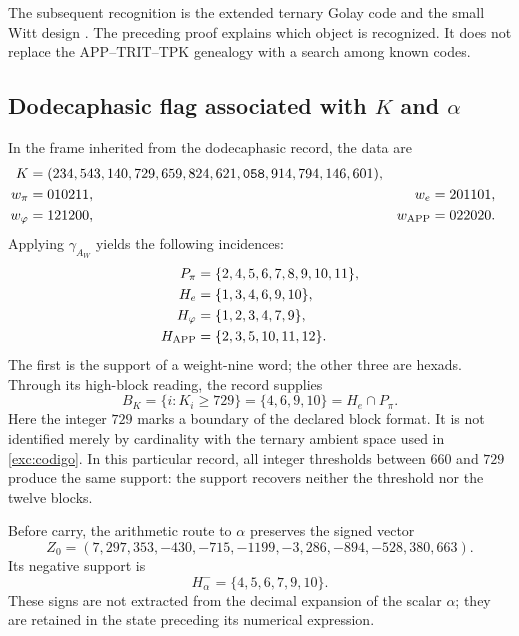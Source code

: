The subsequent recognition is the extended ternary Golay code and
the small Witt design \cite{conwaysloane}. The preceding proof explains which object is
recognized. It does not replace the APP--TRIT--TPK genealogy with a search
among known codes.

\subsection{Dodecaphasic flag associated with \texorpdfstring{$K$ and $\alpha$}{K and alpha}}
\label{exc:bandera}



In the frame inherited from the dodecaphasic record, the data are
\begin{align}
 K={}&(234,543,140,729,659,824,621,\mathtt{058},914,794,146,601),
 \label{exc:k}\\
 w_\pi={}&010211, &w_e={}&201101,\nonumber\\
 w_\varphi={}&121200, &w_{\rm APP}={}&022020.\nonumber
\end{align}
Applying $\gamma_{A_W}$ yields the following incidences:
\begin{align*}
 P_\pi&=\{2,4,5,6,7,8,9,10,11\},\\
 H_e&=\{1,3,4,6,9,10\},\\
 H_\varphi&=\{1,2,3,4,7,9\},\\
 H_{\rm APP}&=\{2,3,5,10,11,12\}.
\end{align*}
The first is the support of a weight-nine word; the other three
are hexads. Through its high-block reading, the record supplies
\begin{equation}
 B_K=\{i:K_i\geq729\}=\{4,6,9,10\}=H_e\cap P_\pi.
 \label{exc:bk}
\end{equation}
Here the integer $729$ marks a boundary of the declared
block format. It is not identified merely by cardinality with the
ternary ambient space used in \eqref{exc:codigo}. In this particular record, all
integer thresholds between $660$ and $729$ produce the same support:
the support recovers neither the threshold nor the twelve blocks.

Before carry, the arithmetic route to $\alpha$ preserves the
signed vector
\begin{equation}
 Z_0=(7,297,353,-430,-715,-1199,-3,286,-894,-528,380,663).
 \label{exc:precarry}
\end{equation}
Its negative support is
\begin{equation}
 H^-_\alpha=\{4,5,6,7,9,10\}.
 \label{exc:halpha}
\end{equation}
These signs are not extracted from the decimal expansion of the scalar
$\alpha$; they are retained in the state preceding its numerical expression.

